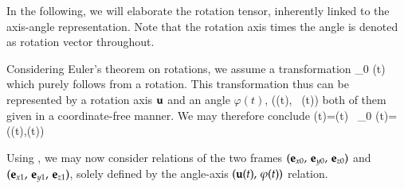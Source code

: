 In the following, we will elaborate the rotation tensor, inherently linked to the axis-angle representation.
Note that the rotation axis times the angle is denoted as rotation vector throughout.

Considering Euler's theorem on rotations, we assume a transformation
\be
  \rv_0 \ra \rv(t)
\ee
which purely follows from a rotation. This transformation thus can be represented by a rotation axis $\mathbf{u}$ and an angle $\varphi(t)$,
\be
  (\uv(t), \, \varphi(t))
\ee
both of them given in a coordinate-free manner.
We may therefore conclude
\be %
  \rv(t)=\Rot(t) \, \rv_0 \qquad {} \qquad \Rot(t)=\Rot(\uv(t),\varphi(t))
\ee
%
%

Using , we may now consider relations of the two frames $(\mathbf{e}_{x0},\,\mathbf{e}_{y0},\,\mathbf{e}_{z0})$ and $(\mathbf{e}_{x1},\,\mathbf{e}_{y1},\,\mathbf{e}_{z1})$, solely defined by the angle-axis $(\mathbf{u}(t), \, \varphi(t))$ relation.
%
%

